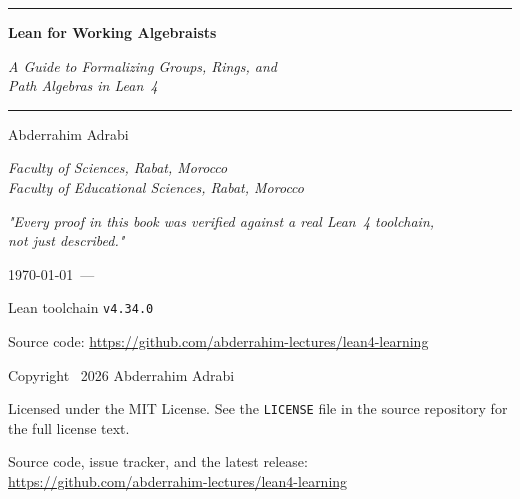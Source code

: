 \begin{titlepage}
\centering
\vspace*{2cm}

{\color{ruleblue}\rule{0.6\textwidth}{1.2pt}}\par
\vspace{0.6cm}

{\normalfont\Huge\bfseries Lean for Working Algebraists\par}
\vspace{0.5cm}
{\normalfont\Large\itshape A Guide to Formalizing Groups, Rings, and\\[2pt]
Path Algebras in Lean~4\par}

\vspace{0.6cm}
{\color{ruleblue}\rule{0.6\textwidth}{1.2pt}}\par

\vspace{2.5cm}
{\normalfont\Large Abderrahim Adrabi\par}
\vspace{0.2cm}
{\normalfont\normalsize\itshape Faculty of Sciences, Rabat, Morocco\\
Faculty of Educational Sciences, Rabat, Morocco\par}

\vfill

{\normalfont\large\itshape "Every proof in this book was verified against
a real Lean~4 toolchain, \\
not just described."\par}

\vspace{1.5cm}
{\normalfont\normalsize \today\ --- \bookversion\par}
{\normalfont\small Lean toolchain \texttt{v4.34.0}\par}
\vspace{0.3cm}
{\normalfont\small Source code:
\url{https://github.com/abderrahim-lectures/lean4-learning}\par}

\end{titlepage}

\clearpage
\thispagestyle{empty}
\null\vfill
\begin{center}
{\normalfont\small
Copyright \textcopyright\ 2026 Abderrahim Adrabi\par
\vspace{0.4cm}
Licensed under the MIT License. See the \texttt{LICENSE} file in the
source repository for the full license text.\par
\vspace{0.4cm}
Source code, issue tracker, and the latest release:\\
\url{https://github.com/abderrahim-lectures/lean4-learning}\par
}
\end{center}
\vfill\null
\clearpage

